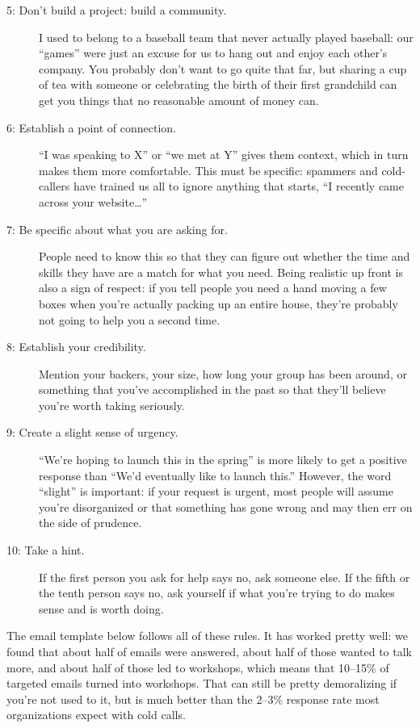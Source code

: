 \begin{description}
\item[5: Don't build a project: build a community.]
  I used to belong to a baseball team that never actually played baseball:
  our ``games'' were just an excuse for us to hang out and enjoy each other's company.
  You probably don't want to go quite that far,
  but sharing a cup of tea with someone or celebrating the birth of their first grandchild
  can get you things that no reasonable amount of money can.

\item[6: Establish a point of connection.]
  ``I was speaking to X'' or ``we met at Y'' gives them context,
  which in turn makes them more comfortable.
  This must be specific:
  spammers and cold-callers have trained us all to ignore anything that starts,
  ``I recently came across your website{\ldots}''

\item[7: Be specific about what you are asking for.]
  People need to know this
  so that they can figure out whether the time and skills they have
  are a match for what you need.
  Being realistic up front is also a sign of respect:
  if you tell people you need a hand moving a few boxes
  when you're actually packing up an entire house,
  they're probably not going to help you a second time.

\item[8: Establish your credibility.]
  Mention your backers,
  your size,
  how long your group has been around, or something that you've accomplished in the past
  so that they'll believe you're worth taking seriously.

\item[9: Create a slight sense of urgency.]
  ``We're hoping to launch this in the spring'' is more likely to get a positive response
  than ``We'd eventually like to launch this.''
  However, the word ``slight'' is important:
  if your request is urgent,
  most people will assume you're disorganized or that something has gone wrong
  and may then err on the side of prudence.

\item[10: Take a hint.]
  If the first person you ask for help says no,
  ask someone else.
  If the fifth or the tenth person says no,
  ask yourself if what you're trying to do makes sense and is worth doing.

\end{description}

The email template below follows all of these rules.
It has worked pretty well:
we found that about half of emails were answered,
about half of those wanted to talk more,
and about half of those led to workshops,
which means that 10--15\% of targeted emails turned into workshops.
That can still be pretty demoralizing if you're not used to it,
but is much better than the 2--3\% response rate most organizations expect with cold calls.

